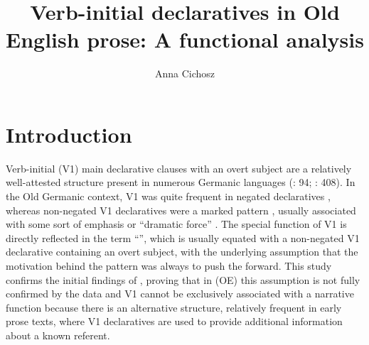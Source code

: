 \documentclass[output=paper,colorlinks,citecolor=brown]{langscibook}
\author{Anna Cichosz\affiliation{University of Łódź}}
\title{Verb-initial declaratives in Old English prose: A functional analysis}
\begin{document}
\maketitle 


\section{Introduction}\label{sec:cichosz:1}

Verb-initial (V1) main declarative clauses with an overt subject are a relatively well-attested structure present in numerous Germanic languages (\citealt{Walkden2014}: 94; \citealt{RingeTaylor2014}: 408). In the Old Germanic context, V1 was quite frequent in negated declaratives \citep{Hopper1975}, whereas non-negated V1 declaratives were a marked pattern \citep{Lehmann2005}, usually associated with some sort of emphasis or “dramatic force” \citep[96]{Smith1971}. The special function of V1 is directly reflected in the term “”, which is usually equated with a non-negated V1 declarative containing an overt subject, with the underlying assumption that the motivation behind the pattern was always to push the  forward. This study confirms the initial findings of \citet{Cichosz2022}, proving that in  (OE) this assumption is not fully confirmed by the data and V1 cannot be exclusively associated with a narrative function because there is an alternative structure, relatively frequent in early prose texts, where V1 declaratives are used to provide additional information about a known referent.
\end{document}
